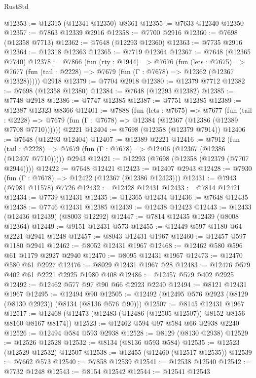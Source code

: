 \begin{lexlean}{RustStd}
\begin{coremodule}
@12353 := @12315 (@12341 @12350) @8361
@12355 := @7633 @12340 @12350
@12357 := @7863 @12339 @2916
@12358 := @7700 @2916
@12360 := @7698 (@12358 @7713)
@12362 := @7648 (@12293 @12360)
@12363 := @7735 @2916
@12364 := @12318 @12363
@12365 := @7719 @12364
@12367 := @7648 (@12365 @7740)
@12378 := @7866
    (fun (rty : @1944) =>
    @7676
      (fun (lets : @7675) =>
      @7677 (fun (tail : @2228) => @7679 (fun (Γ : @7678) => @12362 (@12367 @12328)))))
    @2918
@12379 := @7704 @2918
@12380 := @12379 @7712
@12382 := @7698 (@12358 @12380)
@12384 := @7648 (@12293 @12382)
@12385 := @7748 @2918
@12386 := @7747 @12385
@12387 := @7751 @12385
@12389 := @12387 @12323 @8366
@12401 := @7888
    (fun (lets : @7675) =>
    @7677
      (fun (tail : @2228) =>
      @7679 (fun (Γ : @7678) => @12384 (@12367 (@12386 (@12389 @7708 @7710))))))
    @2221
@12404 := @7698 (@12358 (@12379 @7914))
@12406 := @7648 (@12293 @12404)
@12407 := @12389 @2221
@12416 := @7912
    (fun (tail : @2228) => @7679 (fun (Γ : @7678) => @12406 (@12367 (@12386 (@12407 @7710)))))
    @2943
@12421 := @12293 (@7698 (@12358 (@12379 (@7707 @2944))))
@12422 := @7648 @12421
@12423 := @12407 @2943
@12428 := @7930 (fun (Γ : @7678) => @12422 (@12367 (@12386 @12423)))
@12431 := @7943 (@7981 @11578) @7726
@12432 := @12428 @12431
@12433 := @7814 @12421
@12434 := @7739 @12431
@12435 := @12365 @12434
@12436 := @7648 @12435
@12438 := @7746 @12431 @12385
@12439 := @12438 @12423
@12443 := @12433 (@12436 @12439) (@8003 @12292)
@12447 := @7814 @12435 @12439 (@8008 @12364)
@12449 := @9151 @12431 @573
@12455 := @12449 @597 @1180 @64 @2221 @2941 @1248
@12457 := @8043 @12431 @1967
@12460 := @12457 @597 @1180 @2941
@12462 := @8052 @12431 @1967
@12468 := @12462 @580 @596 @61 @1179 @2927 @2940
@12470 := @8095 @12431 @1967
@12473 := @12470 @580 @61 @2927
@12476 := @8029 @12431 @1967 @28
@12483 := @12476 @579 @402 @61 @2221 @2925 @1980 @408
@12486 := @12457 @579 @402 @2925
@12492 := @12462 @577 @97 @90 @66 @2923 @2240
@12494 := @8121 @12431 @1967
@12495 := @12494 @90
@12505 := @12492 (@12495 @576 @2923 (@8129 (@8130 @2923)) (@8134 (@8136 @576 @90)))
@12507 := @8145 @12431 @1967
@12517 := @12468 (@12473 (@12483 (@12486 (@12505 @12507)) @8152 @8156 @8160 @8167 @8174))
@12523 := @12462 @594 @97 @584 @66 @2938 @2240
@12526 := @12494 @584 @593 @2938
@12528 := @8129 (@8130 @2938)
@12529 := @12526 @12528
@12532 := @8134 (@8136 @593 @584)
@12535 := @12523 (@12529 @12532) @12507
@12538 := @12455 (@12460 (@12517 @12535))
@12539 := @7662 @573
@12540 := @7858 @12539
@12541 := @12538 @12540
@12542 := @7732 @1248
@12543 := @8154 @12542
@12544 := @12541 @12543

\end{coremodule}
\end{lexlean}
